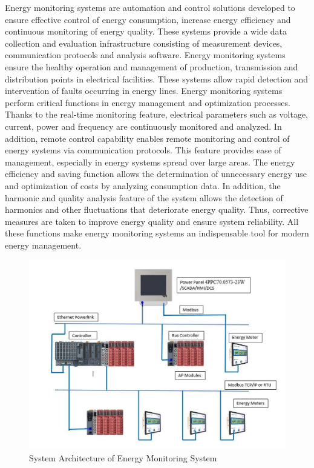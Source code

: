     Energy monitoring systems are automation and control solutions developed to ensure effective control of energy consumption, increase energy efficiency and continuous monitoring of energy quality. These systems provide a wide data collection and evaluation infrastructure consisting of measurement devices, communication protocols and analysis software.
Energy monitoring systems ensure the healthy operation and management of production, transmission and distribution points in electrical facilities. These systems allow rapid detection and intervention of faults occurring in energy lines.
Energy monitoring systems perform critical functions in energy management and optimization processes. Thanks to the real-time monitoring feature, electrical parameters such as voltage, current, power and frequency are continuously monitored and analyzed.
In addition, remote control capability enables remote monitoring and control of energy systems via communication protocols. This feature provides ease of management, especially in energy systems spread over large areas. The energy efficiency and saving function allows the determination of unnecessary energy use and optimization of costs by analyzing consumption data. In addition, the harmonic and quality analysis feature of the system allows the detection of harmonics and other fluctuations that deteriorate energy quality. Thus, corrective measures are taken to improve energy quality and ensure system reliability. All these functions make energy monitoring systems an indispensable tool for modern energy management.



\begin{figure}[H]
    \centering
    \includegraphics[width=0.8\columnwidth]{imgs/System Architecture of Energy Monitoring System.png}
    \caption[Short description for list of figures]{System Architecture of Energy Monitoring System }
    \label{fig-magnitude}
    \end{figure}%


